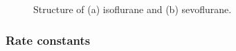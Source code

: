 \begin{figure}
  \caption{Structure of (a) isoflurane and (b) sevoflurane.}
  \label{fig:iso}
\end{figure}


\subsubsection{Rate constants}

